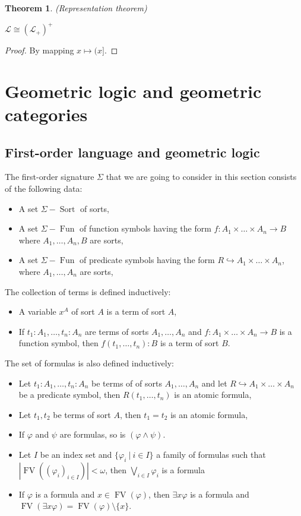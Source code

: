 \documentclass[a4paper]{article}
\theoremstyle{defin}
\theoremstyle{theorem}
\newtheorem{theorem}{Theorem}
\theoremstyle{claim}
\theoremstyle{prop}
\theoremstyle{lemma}
\theoremstyle{fact}
\theoremstyle{ex}
\theoremstyle{col}
\begin{document}
\begin{theorem} (Representation theorem)

$\mathcal{L} \cong (\mathcal{L}_+)^{+}$
\end{theorem}

\begin{proof}
By mapping $x \mapsto (x]$.
\end{proof}

\section{Geometric logic and geometric categories}

\subsection{First-order language and geometric logic}

The first-order signature $\Sigma$ that we are going to consider in this section consists of the following data:
\begin{itemize}
\item A set $\Sigma-\operatorname{Sort}$ of sorts,
\item A set $\Sigma-\operatorname{Fun}$ of function symbols having the form $f : A_1 \times \dots \times A_n \to B$ where $A_1, \dots, A_n, B$ are sorts,
\item A set $\Sigma-\operatorname{Fun}$ of predicate symbols having the form $R \hookrightarrow A_1 \times \dots \times A_n$, where $A_1, \dots, A_n$ are sorts,
\end{itemize}

The collection of terms is defined inductively:
\begin{itemize}
\item A variable $x^A$ of sort $A$ is a term of sort $A$,
\item If $t_1 : A_1, \dots, t_n : A_n$ are terms of sorts $A_1, \dots, A_n$ and $f : A_1 \times \dots \times A_n \to B$ is a function symbol, then $f(t_1, \dots, t_n) : B$ is a term of sort $B$.
\end{itemize}

The set of formulas is also defined inductively:
\begin{itemize}
\item Let $t_1 : A_1, \dots, t_n : A_n$ be terms of of sorts $A_1, \dots, A_n$ and let $R \hookrightarrow A_1 \times \dots \times A_n$ be a predicate symbol, then $R(t_1, \dots, t_n)$ is an atomic formula,
\item Let $t_1, t_2$ be terms of sort $A$, then $t_1 = t_2$ is an atomic formula,
\item If $\varphi$ and $\psi$ are formulas, so is $(\varphi \wedge \psi)$.
\item Let $I$ be an index set and $\{ \varphi_i \: | \: i \in I \}$ a family of formulas such that $|\operatorname{FV}((\varphi_i)_{i \in I})| < \omega$, then $\bigvee \limits_{i \in I} \varphi_i$ is a formula
\item If $\varphi$ is a formula and $x \in \operatorname{FV}(\varphi)$, then $\exists x \varphi$ is a formula and $\operatorname{FV}(\exists x \varphi) = \operatorname{FV}(\varphi) \setminus \{ x \}$.
\end{itemize}
\end{document}
